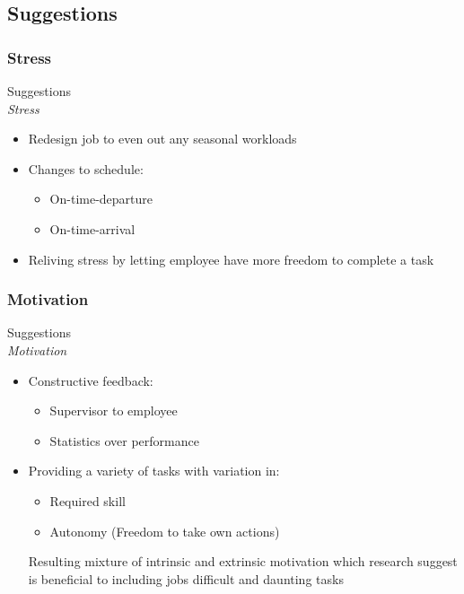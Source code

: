 \subsection{Suggestions}
\subsubsection{Stress}
\begin{frame}{Suggestions\\\small\textit{Stress}}{}
    \begin{itemize}
        \item Redesign job to even out any seasonal workloads
        \item Changes to schedule:
            \begin{itemize}
                \item On-time-departure
                \item On-time-arrival
            \end{itemize}
        \item Reliving stress by letting employee have more freedom to complete a task
    \end{itemize}
\end{frame}

\subsubsection{Motivation}
\begin{frame}{Suggestions\\\small\textit{Motivation}}{}
    \begin{itemize}
        \item Constructive feedback:
            \begin{itemize}
                \item Supervisor to employee
                \item Statistics over performance
            \end{itemize}
        \item Providing a variety of tasks with variation in:
            \begin{itemize}
                \item Required skill
                \item Autonomy (Freedom to take own actions)
            \end{itemize}
                        Resulting mixture of intrinsic and extrinsic motivation which research suggest is beneficial to including jobs difficult and daunting tasks
    \end{itemize}
\end{frame}